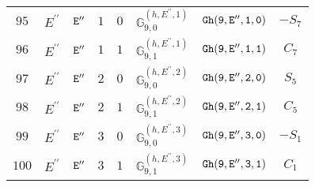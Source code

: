\documentclass[fleqn,8pt]{jsarticle}
\begin{document}
\begin{table}[ht!]
\begin{center}
\begin{tabular}{cccccccc}
$ 95 $ & $ E^{\prime\prime} $ & $ {\tt E''} $ & $ 1 $ & $ 0 $ & $ \mathbb{G}_{9,0}^{(h,E^{\prime\prime},1)} $ & $ {\tt Gh(9,E'',1,0)} $ & $ - S_{7} $ \\
$ 96 $ & $ E^{\prime\prime} $ & $ {\tt E''} $ & $ 1 $ & $ 1 $ & $ \mathbb{G}_{9,1}^{(h,E^{\prime\prime},1)} $ & $ {\tt Gh(9,E'',1,1)} $ & $ C_{7} $ \\
$ 97 $ & $ E^{\prime\prime} $ & $ {\tt E''} $ & $ 2 $ & $ 0 $ & $ \mathbb{G}_{9,0}^{(h,E^{\prime\prime},2)} $ & $ {\tt Gh(9,E'',2,0)} $ & $ S_{5} $ \\
$ 98 $ & $ E^{\prime\prime} $ & $ {\tt E''} $ & $ 2 $ & $ 1 $ & $ \mathbb{G}_{9,1}^{(h,E^{\prime\prime},2)} $ & $ {\tt Gh(9,E'',2,1)} $ & $ C_{5} $ \\
$ 99 $ & $ E^{\prime\prime} $ & $ {\tt E''} $ & $ 3 $ & $ 0 $ & $ \mathbb{G}_{9,0}^{(h,E^{\prime\prime},3)} $ & $ {\tt Gh(9,E'',3,0)} $ & $ - S_{1} $ \\
$ 100 $ & $ E^{\prime\prime} $ & $ {\tt E''} $ & $ 3 $ & $ 1 $ & $ \mathbb{G}_{9,1}^{(h,E^{\prime\prime},3)} $ & $ {\tt Gh(9,E'',3,1)} $ & $ C_{1} $ \\
 \hline \hline
\end{tabular}
\end{center}
\end{table}
\end{document}
